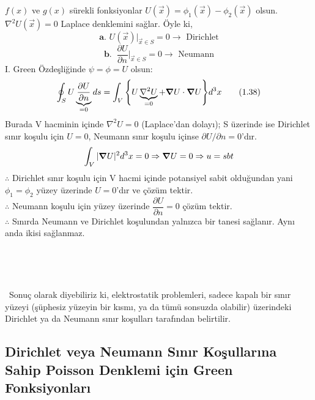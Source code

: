 \begin{theorem}
\begin{tcolorbox}
\end{tcolorbox}
$f(x)$ ve $g(x)$ sürekli fonksiyonlar $U(\Vec{x}) = \phi_{1} (\Vec{x}) - \phi_{2} (\Vec{x})$ olsun. $\nabla^{2} U (\Vec{x}) = 0$ Laplace denklemini sağlar. Öyle ki,
\[ \textbf{a. } U(\Vec{x}) \Bigg|_{\Vec{x} \in S} = 0 \rightarrow \textrm{ Dirichlet}  \]
\[ \textbf{b. } \  \dfrac{\partial U}{\partial n} \Bigg|_{\Vec{x} \in S} = 0 \rightarrow \textrm{ Neumann} \]
I. Green Özdeşliğinde $\psi = \phi = U $ olsun:
\[ \oint_{S} U \underbrace{\dfrac{\partial U}{\partial n}}_{=0} ds = \int_{V} \Bigg\{  U \underbrace{\nabla^{2} U}_{=0} + \grad U  \cdot \grad U\Bigg\} d^{3}x \tag{1.38}\]
Burada V hacminin içinde $\nabla^{2}U=0$ (Laplace'dan dolayı); S üzerinde ise Dirichlet sınır koşulu için $U=0$, Neumann sınır koşulu içinse $\partial U / \partial n =0$'dır.
\[ \int_{V} |\grad U|^{2} d^{3}x = 0 \Rightarrow \grad U = 0 \Rightarrow u=sbt \]
$\therefore$ Dirichlet sınır koşulu için V hacmi içinde potansiyel sabit olduğundan yani $\phi_{1} = \phi_{2}$ yüzey üzerinde $U=0$'dır ve çözüm tektir.\\
$\therefore$ Neumann koşulu için yüzey üzerinde $\dfrac{\partial U}{\partial n} = 0$ çözüm tektir.
\\
$\therefore$ Sınırda Neumann ve Dirichlet koşulundan yalnızca bir tanesi sağlanır. Aynı anda ikisi sağlanmaz.
\end{theorem}

\

\

\dangersign \ Sonuç olarak diyebiliriz ki, elektrostatik problemleri, sadece kapalı bir sınır yüzeyi (şüphesiz yüzeyin bir kısmı, ya da tümü sonsuzda olabilir) üzerindeki Dirichlet ya da Neumann sınır koşulları tarafından belirtilir.

\newpage


\subsection{Dirichlet veya Neumann Sınır Koşullarına Sahip Poisson Denklemi için Green Fonksiyonları}

